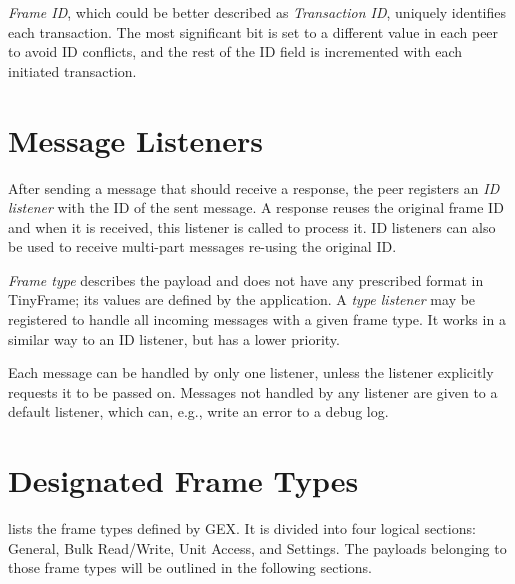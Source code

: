 \textit{Frame ID}, which could be better described as \textit{Transaction ID}, uniquely identifies each transaction. The most significant bit is set to a different value in each peer to avoid ID conflicts, and the rest of the ID field is incremented with each initiated transaction.

\section{Message Listeners} \label{sec:tf-listeners}

After sending a message that should receive a response, the peer registers an \textit{ID listener} with the ID of the sent message. A response reuses the original frame ID and when it is received, this listener is called to process it. ID listeners can also be used to receive multi-part messages re-using the original ID.

\textit{Frame type} describes the payload and does not have any prescribed format in TinyFrame; its values are defined by the application. A \textit{type listener} may be registered to handle all incoming messages with a given frame type. It works in a similar way to an ID listener, but has a lower priority.

Each message can be handled by only one listener, unless the listener explicitly requests it to be passed on. Messages not handled by any listener are given to a default listener, which can, e.g., write an error to a debug log.

\section{Designated Frame Types}

 lists the frame types defined by GEX. It is divided into four logical sections: General, Bulk Read/Write, Unit Access, and Settings. The payloads belonging to those frame types will be outlined in the following sections.

